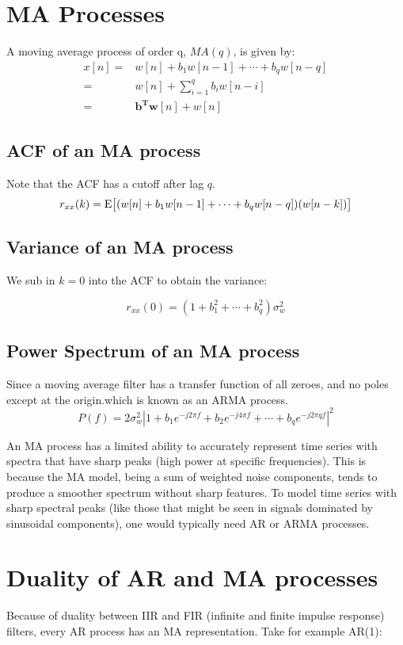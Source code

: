 \section{MA Processes}
A moving average process of order q, $MA(q)$, is given by:
\begin{align}
    x[n]=&w[n]+b_1w[n-1]+\cdots+b_qw[n-q]\\
    =&w[n] + \sum^q_{i=1}b_iw[n-i]\\
    =& \mathbf{b^Tw}[n] + w[n]
\end{align}


\subsection{ACF of an MA process}
Note that the ACF has a cutoff after lag $q$.
\begin{equation}
    r_{xx}(k)=\text{E}\big[(w[n]+b_1w[n-1]+\cdots+b_qw[n-q])(w[n-k])\big]
\end{equation}
\subsection{Variance of an MA process}
We sub in $k=0$ into the ACF to obtain the variance:

\begin{equation}
    r_{xx}(0)=(1+b_1^2+\cdots+b_q^2)\sigma_w^2
\end{equation}

\subsection{Power Spectrum of an MA process}
Since a moving average filter has a transfer function of all zeroes, and no poles except at the origin.which is known as an ARMA process.
\begin{equation}
    P(f)=2\sigma_w^2\left|1+b_1e^{-j2\pi f}+b_2e^{-j4\pi f}+\cdots+b_qe^{-j2\pi qf}\right|^2
\end{equation}

 An MA process has a limited ability to accurately represent time series with spectra that have sharp peaks (high power at specific frequencies). This is because the MA model, being a sum of weighted noise components, tends to produce a smoother spectrum without sharp features. To model time series with sharp spectral peaks (like those that might be seen in signals dominated by sinusoidal components), one would typically need AR or ARMA processes.

\section{Duality of AR and MA processes}
Because of duality between IIR and FIR (infinite and finite impulse response) filters, every AR process has an MA representation. Take for example AR(1):


